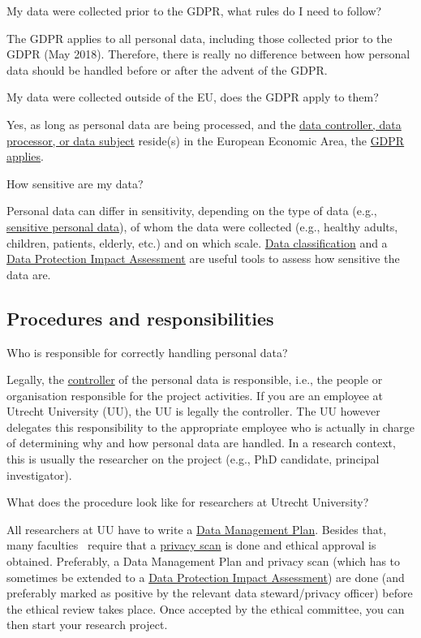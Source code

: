 \documentclass[
]{book}
\begin{document}
My data were collected prior to the GDPR, what rules do I need to follow?

The GDPR applies to all personal data, including those collected prior to the GDPR (May 2018). Therefore, there is really no difference between how personal data should be handled before or after the advent of the GDPR.

My data were collected outside of the EU, does the GDPR apply to them?

Yes, as long as personal data are being processed, and the \protect\hyperlink{definitions}{data controller, data processor, or data subject} reside(s) in the European Economic Area, the \protect\hyperlink{gdpr-scope}{GDPR applies}.~

How sensitive are my data?

Personal data can differ in sensitivity, depending on the type of data (e.g., \protect\hyperlink{special-types-personal-data}{sensitive personal data}), of whom the data were collected (e.g., healthy adults, children, patients, elderly, etc.) and on which scale. \protect\hyperlink{data-classification}{Data classification} and a \protect\hyperlink{dpia}{Data Protection Impact Assessment} are useful tools to assess how sensitive the data are.

\hypertarget{procedures}{%
\subsection{Procedures and responsibilities}\label{procedures}}

Who is responsible for correctly handling personal data?

Legally, the \protect\hyperlink{definitions}{controller} of the personal data is responsible, i.e., the people or organisation responsible for the project activities. If you are an employee at Utrecht University (UU), the UU is legally the controller. The UU however delegates this responsibility to the appropriate employee who is actually in charge of determining why and how personal data are handled. In a research context, this is usually the researcher on the project (e.g., PhD candidate, principal investigator).

What does the procedure look like for researchers at Utrecht University?

All researchers at UU have to write a \href{https://www.uu.nl/en/research/research-data-management/guides/data-management-planning}{Data Management Plan}. Besides that, many faculties ~require that a \protect\hyperlink{privacy-scan}{privacy scan} is done and ethical approval is obtained. Preferably, a Data Management Plan and privacy scan (which has to sometimes be extended to a \protect\hyperlink{dpia}{Data Protection Impact Assessment}) are done (and preferably marked as positive by the relevant data steward/privacy officer) before the ethical review takes place. Once accepted by the ethical committee, you can then start your research project.
\end{document}
